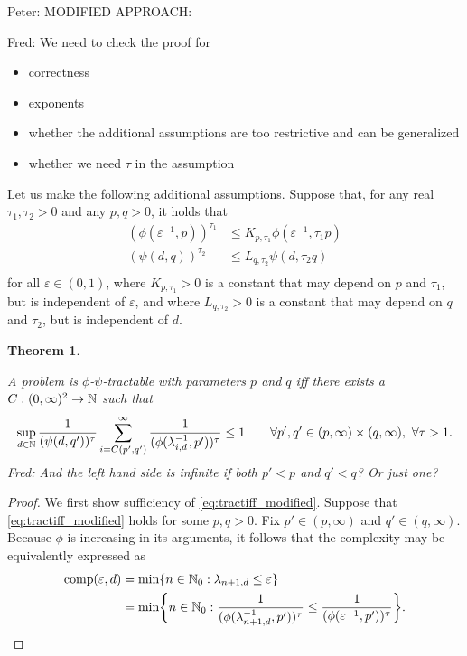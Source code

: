 \documentclass{article}
\newtheorem{theorem}{Theorem}
\theoremstyle{definition}
\newcommand{\fred}[1]{\begingroup\color{blue}Fred: #1\endgroup}
\newcommand{\peter}[1]{\begingroup\color{purple}Peter: #1\endgroup}
\begin{document}
\peter{
MODIFIED APPROACH:

\bigskip

\fred{We need to check the proof for 
\begin{itemize}
\item correctness
\item exponents
\item whether the additional assumptions are too restrictive and can be generalized
\item whether we need $\tau$ in the assumption
\end{itemize}}

Let us make the following additional assumptions. Suppose that, for any real $\tau_1, \tau_2>0$ and any $p,q>0$, it holds that
\begin{align*}
 (\phi(\varepsilon^{-1},p))^{\tau_1} &\le K_{p,\tau_1} \phi (\varepsilon^{-1},\tau_1 p)\\
  (\psi(d,q))^{\tau_2} &\le L_{q,\tau_2} \psi (d,\tau_2 q)\\
\end{align*}
for all $\varepsilon\in (0,1)$, where $K_{p,\tau_1}>0$ is a constant that may depend on $p$ and $\tau_1$, but is independent of $\varepsilon$, and where $L_{q,\tau_2}>0$ is a constant that may depend on $q$ and $\tau_2$, but is independent of $d$.



\begin{theorem}\label{thm_main_modified}

A problem is $\phi$-$\psi$-tractable with parameters $p$ and $q$ iff there exists a  $C : (0,\infty)^2 \to \mathbb{N}$  such that
\begin{equation} \label{eq:tractiff_modified}
    \sup_{d \in \mathbb{N}} \frac{1}{(\psi(d,q'))^\tau} \sum_{i = C(p',q')}^\infty \frac{1}{(\phi(\lambda_{i, d}^{-1},p'))^\tau} \le 1 \qquad \forall p',q' \in (p,\infty)\times (q,\infty),\ \forall \tau>1.
\end{equation}
\fred{And the left hand side is infinite if both $p' < p$ and $q' < q$?  Or just one?}
\end{theorem}
\begin{proof}
We first show sufficiency of \eqref{eq:tractiff_modified}. Suppose that \eqref{eq:tractiff_modified} holds for some $p,q>0$. Fix $p'\in (p,\infty)$ and $q'\in (q,\infty)$. Because $\phi$ is increasing in its arguments, it follows that the complexity may be equivalently expressed as 
\begin{align*}
    \operatorname{comp}(\varepsilon, d) &= \min \{n \in \mathbb{N}_{0} : \lambda_{n+1, d} \le \varepsilon\} \\
    &= \min \biggl\{n \in \mathbb{N}_{0} : \frac{1}{(\phi(\lambda_{n+1, d}^{-1},p'))^\tau} \le \frac{1}{(\phi(\varepsilon^{-1},p'))^\tau} \biggr\}.
\end{align*}


\end{proof}}
\end{document}

